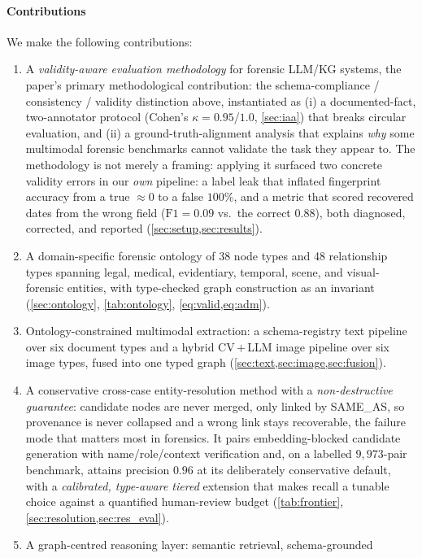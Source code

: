 \documentclass[conference]{IEEEtran}
\newcommand{\rel}[1]{\textup{\MakeUppercase{#1}}}
\begin{document}
\paragraph*{Contributions} We make the following contributions:
\begin{enumerate}[leftmargin=1.4em,itemsep=2pt,topsep=2pt]
\item A \emph{validity-aware evaluation methodology} for forensic LLM/KG
systems, the paper's primary methodological contribution: the schema-compliance /
consistency / validity distinction above, instantiated as (i) a documented-fact,
two-annotator protocol (Cohen's $\kappa=0.95$/$1.0$, \cref{sec:iaa}) that breaks
circular evaluation, and (ii) a ground-truth-alignment analysis that explains
\emph{why} some multimodal forensic benchmarks cannot validate the task they
appear to. The methodology is not merely a framing: applying it surfaced two
concrete validity errors in our \emph{own} pipeline: a label leak that inflated
fingerprint accuracy from a true $\approx\!0$ to a false $100\%$, and a metric that
scored recovered dates from the wrong field ($\mathrm{F1}=0.09$ vs.\ the correct
$0.88$), both diagnosed, corrected, and reported (\cref{sec:setup,sec:results}).
\item A domain-specific forensic ontology of 38 node types and 48 relationship
types spanning legal, medical, evidentiary, temporal, scene, and visual-forensic
entities, with type-checked graph construction as an invariant
(\cref{sec:ontology}, \cref{tab:ontology}, \cref{eq:valid,eq:adm}).
\item Ontology-constrained multimodal extraction: a schema-registry text
pipeline over six document types and a hybrid CV\,$+$\,LLM image pipeline over six
image types, fused into one typed graph (\cref{sec:text,sec:image,sec:fusion}).
\item A conservative cross-case entity-resolution method with a
\emph{non-destructive guarantee}: candidate nodes are never merged, only linked by
\rel{same\_as}, so provenance is never collapsed and a wrong link stays
recoverable, the failure mode that matters most in forensics. It pairs
embedding-blocked candidate generation with name/role/context verification and, on
a labelled $9{,}973$-pair benchmark, attains precision $0.96$ at its deliberately
conservative default, with a \emph{calibrated, type-aware tiered} extension that
makes recall a tunable choice against a quantified human-review budget
(\cref{tab:frontier}, \cref{sec:resolution,sec:res_eval}).
\item A graph-centred reasoning layer: semantic retrieval, schema-grounded

\end{enumerate}
\end{document}
